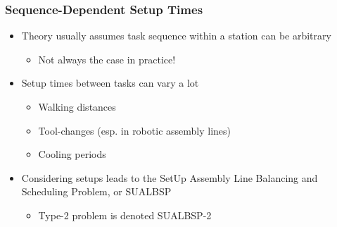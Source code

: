 \documentclass{beamer}
\begin{document}
\begin{frame}
\frametitle{Sequence-Dependent Setup Times}
\begin{itemize}
	\item Theory usually assumes task sequence within a station can be arbitrary\vspace{2mm}
	\begin{itemize}
		\item Not always the case in practice!\vspace{2mm}\pause
	\end{itemize}
	\item Setup times between tasks can vary a lot\vspace{2mm}
	\begin{itemize}
		\item Walking distances\vspace{1mm}
		\item Tool-changes (esp. in robotic assembly lines)\vspace{1mm}
		\item Cooling periods\vspace{3mm}\pause
	\end{itemize}
	\item Considering setups leads to the SetUp Assembly Line Balancing and Scheduling Problem, or SUALBSP\vspace{1mm}
	\begin{itemize}
		\item Type-2 problem is denoted SUALBSP-2
	\end{itemize}
\end{itemize}
\end{frame}
\end{document}
